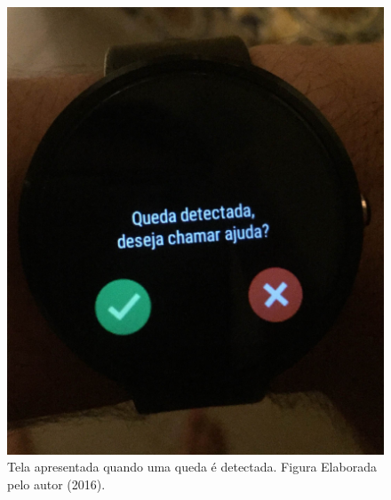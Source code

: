 \begin{figure}[ht]
	\centering
	\includegraphics[scale=0.12]{imagens/screen_fall.png}
	\caption{ Tela apresentada quando uma queda é detectada. Figura Elaborada pelo autor (2016).}
	\label{fig:monitor_fall}
\end{figure}



